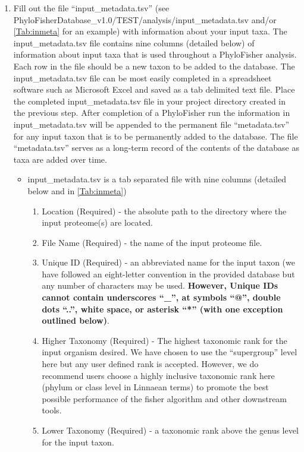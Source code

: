 \documentclass{article}
\begin{document}
\begin{enumerate}[itemsep=12pt]
        \item Fill out the file “input\_metadata.tsv” (see PhyloFisherDatabase\_v1.0/TEST/analysis/input\_metadata.tsv and/or \autoref{Tab:inmeta} for an example) with information about your input taxa. The input\_metadata.tsv file contains nine columns (detailed below) of information about input taxa that is used throughout a PhyloFisher analysis. Each row in the file should be a new taxon to be added to the database. The input\_metadata.tsv file can be most easily completed in a spreadsheet software such as Microsoft Excel and saved as a tab delimited text file. Place the completed input\_metadata.tsv file in your project directory created in the previous step. After completion of a PhyloFisher run the information in input\_metadata.tsv will be appended to the permanent file “metadata.tsv” for any input taxon that is to be permanently added to the database. The file “metadata.tsv” serves as a long-term record of the contents of the database as taxa are added over time. \label{sec:inmeta}
        \begin{itemize}
            \item input\_metadata.tsv is a tab separated file with nine columns (detailed below and in \autoref{Tab:inmeta})
            \begin{enumerate}[label=\arabic*.] 
                \item Location (Required) - the absolute path to the directory where the input proteome(s) are located.
                \item File Name (Required) - the name of the input proteome file.
                \item Unique ID (Required) - an abbreviated name for the input taxon (we have followed an eight-letter convention in the provided database but any number of characters may be used. \textbf{However, Unique IDs cannot contain underscores “\_”, at symbols “@”, double dots “..”, white space, or asterisk “*” (with one exception outlined below)}.
                \item Higher Taxonomy (Required) - The highest taxonomic rank for the input organism desired. We have chosen to use the “supergroup” level here but any user defined rank is accepted. However, we do recommend users choose a highly inclusive taxonomic rank here (phylum or class level in Linnaean terms) to promote the best possible performance of  the fisher algorithm and other downstream tools. 
                \item Lower Taxonomy (Required) - a taxonomic rank above the genus level for the input taxon.

\end{enumerate}
\end{itemize}
\end{enumerate}
\end{document}
